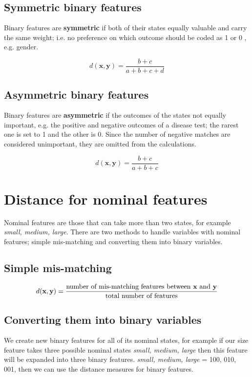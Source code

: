 \documentclass[11pt,fleqn]{book} %
\begin{document}
\subsection*{Symmetric binary features}
Binary features are \textbf{symmetric} if both of their states equally valuable and carry the same weight; i.e. no
preference on which outcome should be coded as 1 or 0 , e.g. gender.

\begin{center}
	$$d(\mathbf{x}, \mathbf{y}) = \frac{b + c}{a + b + c + d}$$
\end{center}


\subsection*{Asymmetric binary features}
Binary features are \textbf{asymmetric} if the outcomes of the states not equally important, e.g. the positive and negative
outcomes of a disease test; the rarest one is set to 1 and the other is 0. Since the number of negative matches are considered unimportant, they are omitted from the calculations.

\begin{center}
	$$d(\mathbf{x}, \mathbf{y}) = \frac{b + c}{a + b + c}$$
\end{center}

\section{Distance for nominal features}
Nominal features are those that can take more than two states, for example {\textit{small, medium, large}}. There are two methods to handle variables with nominal features; simple mis-matching and converting them into binary variables.

\subsection*{Simple mis-matching}
$$d(\mathbf{x}, \mathbf{y}) = \frac{\text{number of mis-matching features between \textbf{x} and \textbf{y}}}{\text{total number of features}}$$

\subsection*{Converting them into binary variables}
We create new binary features for all of its nominal states, for example if our size feature takes three possible nominal states \textit{{small, medium, large}} then this feature will be expanded into three binary features. \textit{{small, medium, large}} = {100, 010, 001}, then we can use the distance measures for binary features.
\end{document}
